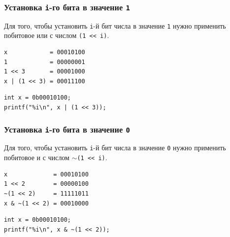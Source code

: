 \documentclass[10pt]{article}
\begin{document}
\subsubsection*{Установка \texttt{i}-го бита в значение \texttt{1}}
Для того, чтобы установить \texttt{i}-й бит числа в значение \texttt{1} нужно применить побитовое или с числом \texttt{(1 <{}< i)}.

\begin{minipage}{0.35\textwidth}
\begin{lstlisting}
x            = 00010100
1            = 00000001
1 << 3       = 00001000
x | (1 << 3) = 00011100
\end{lstlisting}
\end{minipage}
\hfill
\begin{minipage}{0.55\textwidth}
\begin{lstlisting}
int x = 0b00010100;
printf("%i\n", x | (1 << 3));
\end{lstlisting}
\end{minipage}

\subsubsection*{Установка \texttt{i}-го бита в значение \texttt{0}}
Для того, чтобы установить \texttt{i}-й бит числа в значение \texttt{0} нужно применить побитовое и с числом \texttt{$\sim$(1 <{}< i)}.

\begin{minipage}{0.35\textwidth}
\begin{lstlisting}
x             = 00010100
1 << 2        = 00000100
~(1 << 2)     = 11111011
x & ~(1 << 2) = 00010000
\end{lstlisting}
\end{minipage}
\hfill
\begin{minipage}{0.55\textwidth}
\begin{lstlisting}
int x = 0b00010100;
printf("%i\n", x & ~(1 << 2));
\end{lstlisting}
\end{minipage}


\newpage
\end{document}
